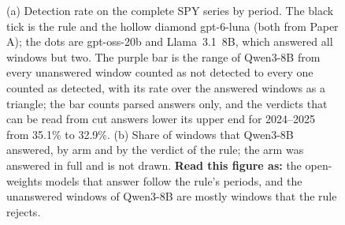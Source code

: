 \begin{figure}[!t]
\centering
\resultfigure{\figRate}
\caption{(a) Detection rate on the complete SPY series by period. The black tick is the rule and the hollow diamond gpt-6-luna (both from Paper A); the dots are gpt-oss-20b and Llama~3.1~8B, which answered all windows but two. The purple bar is the range of Qwen3-8B from every unanswered window counted as not detected to every one counted as detected, with its rate over the answered windows as a triangle; the bar counts parsed answers only, and the verdicts that can be read from cut answers lower its upper end for 2024--2025 from 35.1\% to 32.9\%. (b) Share of windows that Qwen3-8B answered, by arm and by the verdict of the rule; the arm  was answered in full and is not drawn. \textbf{Read this figure as:} the open-weights models that answer follow the rule's periods, and the unanswered windows of Qwen3-8B are mostly windows that the rule rejects.}
\label{fig:rate}
\end{figure}
